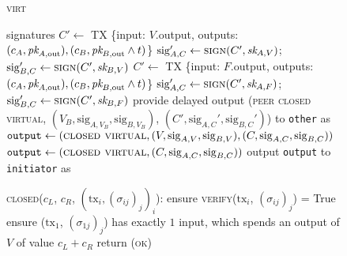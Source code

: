 \begin{figure}[H]
\begin{processbox}{\textsc{virt}}
\begin{algorithmic}[1]
{              signatures}
              \State $C' \gets$ TX \{input: $V$.output, outputs: $(c_A, \textit{pk}_{A,
              \mathrm{out}}), (c_B, \textit{pk}_{B, \mathrm{out}} \wedge t)$\}
              \State $\mathrm{sig}_{A, C}' \gets \textsc{sign}(C', \textit{sk}_{A, V})$;
              $\mathrm{sig}_{B, C}' \gets \textsc{sign}(C', \textit{sk}_{B, V})$
            \Else \: 
              \State $C' \gets$ TX \{input: $F$.output, outputs: $(c_A, \textit{pk}_{A,
              \mathrm{out}}), (c_B, \textit{pk}_{B, \mathrm{out}} \wedge t)$\}
              \State $\mathrm{sig}_{A, C}' \gets \textsc{sign}(C', \textit{sk}_{A, F})$;
              $\mathrm{sig}_{B, C}' \gets \textsc{sign}(C', \textit{sk}_{B, F})$
            \EndIf
            \State provide delayed output (\textsc{peer closed virtual}, $(V_B,
            \mathrm{sig}_{A, V_B}, \mathrm{sig}_{B, V_B})$, $(C',
            \mathrm{sig}_{A, C}', \mathrm{sig}_{B, C}')$) to \texttt{other} as
            \bob
          \EndIf
            \State $\mathtt{output} \gets (\textsc{closed virtual}, (V,
            \mathrm{sig}_{A, V}, \mathrm{sig}_{B, V}), (C, \mathrm{sig}_{A, C},
            \mathrm{sig}_{B, C}))$
          \Else
            \State $\mathtt{output} \gets (\textsc{closed virtual}, (C,
            \mathrm{sig}_{A, C}, \mathrm{sig}_{B, C}))$
          \EndIf
          \State output \texttt{output} to \texttt{initiator} as \alice
        \EndIf
        \Statex

        \State \textsc{closed}($c_L$, $c_R$, $(\mathrm{tx}_i,
        (\sigma_{ij})_j)_i$):
        \Indent
            \State ensure \textsc{verify}($\mathrm{tx}_i$, $(\sigma_{ij})_j$) =
            True
          \EndFor
          \State ensure ($\mathrm{tx}_1$, $(\sigma_{1j})_j$) has exactly $1$
          input, which spends an output of $V$ of value $c_L + c_R$
          \State return (\textsc{ok})
        \EndIndent
    \end{algorithmic}
  \end{processbox}
  \caption{}
  \label{code:virtual-layer}
\end{figure}
